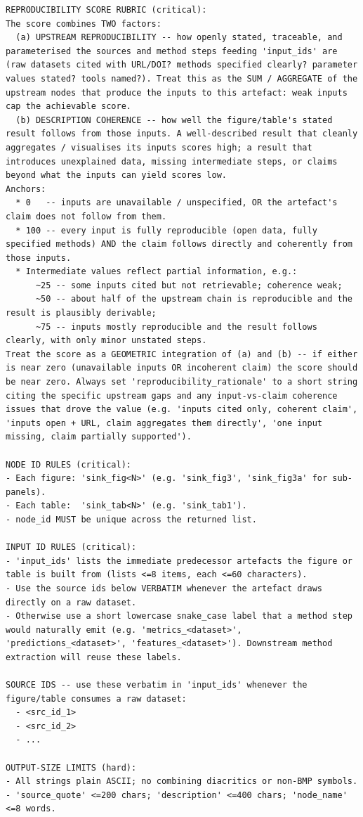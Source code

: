 \documentclass{article}
\begin{document}
\begin{lstlisting}
REPRODUCIBILITY SCORE RUBRIC (critical):
The score combines TWO factors:
  (a) UPSTREAM REPRODUCIBILITY -- how openly stated, traceable, and parameterised the sources and method steps feeding 'input_ids' are (raw datasets cited with URL/DOI? methods specified clearly? parameter values stated? tools named?). Treat this as the SUM / AGGREGATE of the upstream nodes that produce the inputs to this artefact: weak inputs cap the achievable score.
  (b) DESCRIPTION COHERENCE -- how well the figure/table's stated result follows from those inputs. A well-described result that cleanly aggregates / visualises its inputs scores high; a result that introduces unexplained data, missing intermediate steps, or claims beyond what the inputs can yield scores low.
Anchors:
  * 0   -- inputs are unavailable / unspecified, OR the artefact's claim does not follow from them.
  * 100 -- every input is fully reproducible (open data, fully specified methods) AND the claim follows directly and coherently from those inputs.
  * Intermediate values reflect partial information, e.g.:
      ~25 -- some inputs cited but not retrievable; coherence weak;
      ~50 -- about half of the upstream chain is reproducible and the result is plausibly derivable;
      ~75 -- inputs mostly reproducible and the result follows clearly, with only minor unstated steps.
Treat the score as a GEOMETRIC integration of (a) and (b) -- if either is near zero (unavailable inputs OR incoherent claim) the score should be near zero. Always set 'reproducibility_rationale' to a short string citing the specific upstream gaps and any input-vs-claim coherence issues that drove the value (e.g. 'inputs cited only, coherent claim', 'inputs open + URL, claim aggregates them directly', 'one input missing, claim partially supported').

NODE ID RULES (critical):
- Each figure: 'sink_fig<N>' (e.g. 'sink_fig3', 'sink_fig3a' for sub-panels).
- Each table:  'sink_tab<N>' (e.g. 'sink_tab1').
- node_id MUST be unique across the returned list.

INPUT ID RULES (critical):
- 'input_ids' lists the immediate predecessor artefacts the figure or table is built from (lists <=8 items, each <=60 characters).
- Use the source ids below VERBATIM whenever the artefact draws directly on a raw dataset.
- Otherwise use a short lowercase snake_case label that a method step would naturally emit (e.g. 'metrics_<dataset>', 'predictions_<dataset>', 'features_<dataset>'). Downstream method extraction will reuse these labels.

SOURCE IDS -- use these verbatim in 'input_ids' whenever the figure/table consumes a raw dataset:
  - <src_id_1>
  - <src_id_2>
  - ...

OUTPUT-SIZE LIMITS (hard):
- All strings plain ASCII; no combining diacritics or non-BMP symbols.
- 'source_quote' <=200 chars; 'description' <=400 chars; 'node_name' <=8 words.
\end{lstlisting}
\end{document}
